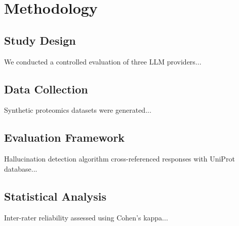 \section{Methodology}

\subsection{Study Design}
We conducted a controlled evaluation of three LLM providers...

\subsection{Data Collection}
Synthetic proteomics datasets were generated...

\subsection{Evaluation Framework}
Hallucination detection algorithm cross-referenced responses with UniProt database...

\subsection{Statistical Analysis}
Inter-rater reliability assessed using Cohen's kappa...
